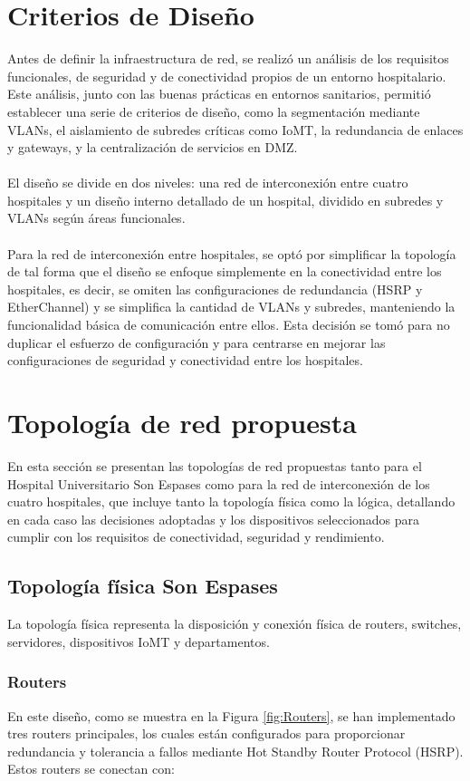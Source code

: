 \section{Criterios de Diseño}
\label{sec:criterios}
Antes de definir la infraestructura de red, se realizó un análisis de los requisitos funcionales, de seguridad y de conectividad propios de un entorno hospitalario. Este 
análisis, junto con las buenas prácticas en entornos sanitarios, permitió establecer una serie de criterios de diseño, como la segmentación mediante VLANs, el aislamiento 
de subredes críticas como IoMT, la redundancia de enlaces y gateways, y la centralización de servicios en DMZ.
\\ \\
El diseño se divide en dos niveles: una red de interconexión entre cuatro hospitales y un diseño interno detallado de un hospital, dividido en subredes y VLANs según áreas funcionales.
\\  \\
Para la red de interconexión entre hospitales, se optó por simplificar la topología de tal forma que el diseño se enfoque simplemente en la conectividad entre los hospitales, es decir,
se omiten las configuraciones de redundancia (HSRP y EtherChannel) y se simplifica la cantidad de VLANs y subredes, manteniendo la funcionalidad básica de comunicación entre ellos. Esta decisión se tomó 
para no duplicar el esfuerzo de configuración y para centrarse en mejorar las configuraciones de seguridad y conectividad entre los hospitales. 

\section{Topología de red propuesta}
En esta sección se presentan las topologías de red propuestas tanto para el Hospital Universitario Son Espases como para la red de interconexión de los cuatro hospitales, que incluye tanto la topología física como la lógica, detallando en cada caso las decisiones adoptadas
y los dispositivos seleccionados para cumplir con los requisitos de conectividad, seguridad y rendimiento.

\subsection{Topología física Son Espases}
La topología física representa la disposición y conexión física de routers, switches, servidores, dispositivos IoMT y departamentos.
\subsubsection{Routers}
En este diseño, como se muestra en la Figura \ref{fig:Routers}, se han implementado tres routers principales, los cuales están configurados para proporcionar 
redundancia y tolerancia a fallos mediante Hot Standby Router Protocol (HSRP). Estos routers se conectan con:

